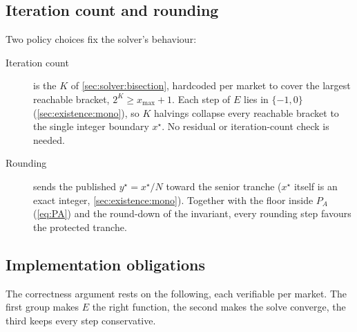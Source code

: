 \subsection{Iteration count and rounding}
\label{sec:solver:rounding}

Two policy choices fix the solver's behaviour:
\begin{description}
  \item[Iteration count] is the $K$ of \cref{sec:solver:bisection},
    hardcoded per market to cover the largest reachable bracket,
    $2^K \geq x_{\max} + 1$. Each step of $E$ lies in $\{-1, 0\}$
    (\cref{sec:existence:mono}), so $K$ halvings collapse every
    reachable bracket to the single integer boundary $x^\star$. No
    residual or iteration-count check is needed.
  \item[Rounding] sends the published $y^\star = x^\star/N$ toward the
    senior tranche ($x^\star$ itself is an exact integer,
    \cref{sec:existence:mono}). Together with the
    floor inside $P_A$ (\cref{eq:PA}) and the round-down of the
    invariant, every rounding step favours the protected tranche.
\end{description}

\subsection{Implementation obligations}
\label{sec:solver:obligations}

The correctness argument rests on the following, each verifiable per
market. The first group makes $E$ the right function, the second makes
the solve converge, the third keeps every step conservative.

